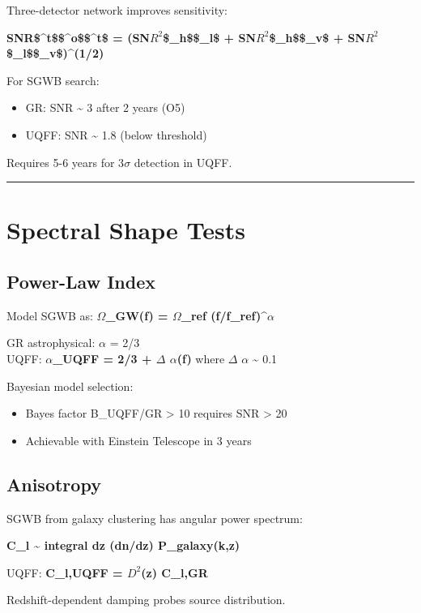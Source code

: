 \documentclass[12pt,a4paper]{article}
\begin{document}
Three-detector network improves sensitivity:

\textbf{SNR\$\^{}{t}\$\$\^{}{o}\$\$\^{}{t}\$ = (SN$R^{2}$\$\_{h}\$\$\_{l}\$ + SN$R^{2}$\$\_{h}\$\$\_{v}\$ + SN$R^{2}$\$\_{l}\$\$\_{v}\$)\^{}(1/2)}

For SGWB search:

\begin{itemize}
  \item GR: SNR \textasciitilde{} 3 after 2 years (O5)
  \item UQFF: SNR \textasciitilde{} 1.8 (below threshold)
\end{itemize}

Requires 5-6 years for 3$\sigma$ detection in UQFF.

\medskip\hrule\medskip

\section{Spectral Shape Tests}

\subsection{Power-Law Index}

Model SGWB as: \textbf{$\Omega$\_GW(f) = $\Omega$\_ref (f/f\_ref)\^{}$\alpha$}

GR astrophysical: $\alpha$ = 2/3 \\  UQFF: \textbf{$\alpha$\_UQFF = 2/3 + $\Delta$ $\alpha$(f)} where $\Delta$ $\alpha$ \textasciitilde{} 0.1

Bayesian model selection:

\begin{itemize}
  \item Bayes factor B\_UQFF/GR > 10 requires SNR > 20
  \item Achievable with Einstein Telescope in 3 years
\end{itemize}

\subsection{Anisotropy}

SGWB from galaxy clustering has angular power spectrum:

\textbf{C\_l \textasciitilde{}  integral  dz (dn/dz) P\_galaxy(k,z)}

UQFF: \textbf{C\_l,UQFF = $D^{2}$(z) C\_l,GR}

Redshift-dependent damping probes source distribution.
\end{document}

